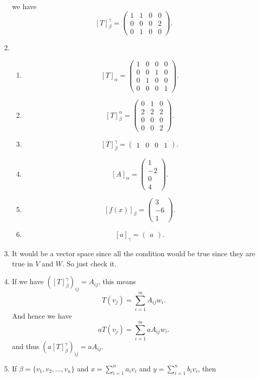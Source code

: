 \begin{enumerate}
\begin{align*}
\end{align*}
we have 
\[[T]_{\beta }^{\gamma }=\left(\begin{array}{cccc}1&1&0&0\\0&0&0&2\\0&1&0&0 \end{array}\right).\]
\item \begin{enumerate}
\item \[[T]_{\alpha}=\left(\begin{array}{cccc}1&0&0&0\\0&0&1&0\\0&1&0&0\\0&0&0&1 \end{array}\right).\]
\item \[[T]_{\beta }^{\alpha }=\left(\begin{array}{ccc}0&1&0\\2&2&2\\0&0&0\\0&0&2 \end{array}\right).\]
\item \[[T]_{\beta }^{\gamma}=\left(\begin{array}{cccc}1&0&0&1 \end{array}\right).\]
\item \[[A]_{\alpha}=\left(\begin{array}{c}1\\-2\\0\\4 \end{array}\right).\]
\item \[[f(x)]_{\beta }=\left(\begin{array}{c}3\\-6\\1 \end{array}\right).\]
\item \[[a]_{\gamma }=\left(\begin{array}{c}a \end{array}\right).\]
\end{enumerate}
\item It would be a vector space since all the condition would be true since they are true in $V$ and $W$. So just check it.
\item If we have $([T]_{\beta }^{\gamma })_{ij}=A_{ij}$, this means 
\[T(v_j)=\sum_{i=1}^m{A_{ij}w_i}.\]
And hence we have 
\[aT(v_j)=\sum_{i=1}^m{aA_{ij}w_i}.\]
and thus $(a[T]_{\beta }^{\gamma })_{ij}=aA_{ij}$.
\item If $\beta =\{v_1,v_2,\ldots ,v_n\}$ and $x=\sum_{i=1}^n{a_iv_i}$ and $y=\sum_{i=1}^n{b_iv_i}$, then 

\end{enumerate}
